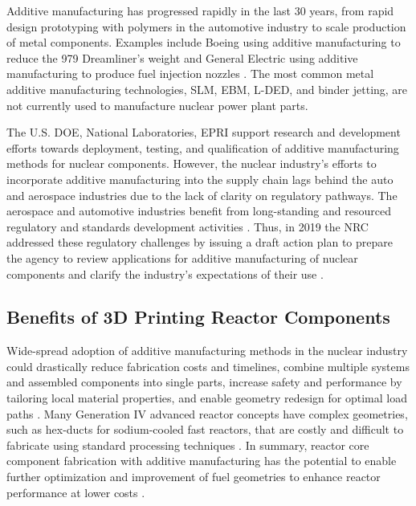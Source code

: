 Additive manufacturing has progressed rapidly in the last 30 years, from rapid 
design prototyping with polymers in the automotive industry to scale production 
of metal components.  
Examples include Boeing using additive manufacturing to reduce the 979 
Dreamliner's weight \cite{noauthor_printed_2017} and General Electric using 
additive manufacturing to produce fuel injection nozzles 
\cite{noauthor_transformation_2018}. 
The most common metal additive manufacturing technologies, \gls{SLM}, \gls{EBM}, 
\gls{L-DED}, and binder jetting, are not currently used to manufacture nuclear 
power plant parts. 

The U.S. \gls{DOE}, National Laboratories, \gls{EPRI} support research and 
development efforts towards deployment, testing, and qualification 
of additive manufacturing methods for nuclear components. 
However, the nuclear industry's efforts to incorporate additive manufacturing 
into the supply chain lags behind the auto and aerospace industries due to the 
lack of clarity on regulatory pathways. 
The aerospace and automotive industries benefit from long-standing and resourced 
regulatory and standards development activities \cite{noauthor_roadmap_nodate}. 
Thus, in 2019 the \gls{NRC} addressed these regulatory challenges by issuing 
a draft action plan to prepare the agency to review applications for 
additive manufacturing of nuclear components and clarify the industry's 
expectations of their use \cite{noauthor_roadmap_nodate}.

\subsection{Benefits of 3D Printing Reactor Components}
\label{sec:am}
Wide-spread adoption of additive manufacturing methods in the nuclear industry 
could drastically reduce fabrication costs and timelines, combine multiple 
systems and assembled components into single parts, increase safety and 
performance by tailoring local material properties, and enable geometry 
redesign for optimal load paths \cite{simpson_considerations_2019}. 
Many Generation IV advanced reactor concepts have complex geometries, 
such as hex-ducts for sodium-cooled fast reactors, that are costly and difficult 
to fabricate using standard processing techniques \cite{sridharan_performance_2019}.  
In summary, reactor core component fabrication with additive manufacturing 
has the potential to enable further optimization and improvement of fuel 
geometries to enhance reactor performance at lower costs \cite{bergeron_early_2018}. 

